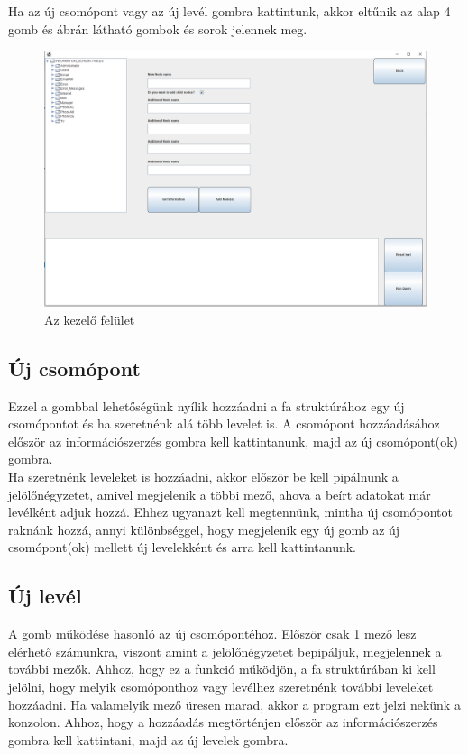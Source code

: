 Ha az új csomópont vagy az új levél gombra kattintunk, akkor eltűnik az alap 4 gomb és  ábrán látható gombok és sorok jelennek meg.

\begin{figure} [H]
	\centering
	\includegraphics[width=.9\textwidth]{images/modify_screen.png}
	\caption{Az kezelő felület}
	\label{fig:modify_screen}
\end{figure}

\subsection{Új csomópont} Ezzel a gombbal lehetőségünk nyílik hozzáadni a fa struktúrához egy új csomópontot és ha szeretnénk alá több levelet is. A csomópont hozzáadásához először az információszerzés gombra kell kattintanunk, majd az új csomópont(ok) gombra.\\
Ha szeretnénk leveleket is hozzáadni, akkor először be kell pipálnunk a jelölőnégyzetet, amivel megjelenik a többi mező, ahova a beírt adatokat már levélként adjuk hozzá. Ehhez ugyanazt kell megtennünk, mintha új csomópontot raknánk hozzá, annyi különbséggel, hogy megjelenik egy új gomb az új csomópont(ok) mellett új levelekként és arra kell kattintanunk. 

\subsection{Új levél} A gomb működése hasonló az új csomópontéhoz. Először csak 1 mező lesz elérhető számunkra, viszont amint a jelölőnégyzetet bepipáljuk, megjelennek a további mezők. Ahhoz, hogy ez a funkció működjön, a fa struktúrában ki kell jelölni, hogy melyik csomóponthoz vagy levélhez szeretnénk további leveleket hozzáadni. Ha valamelyik mező üresen marad, akkor a program ezt jelzi nekünk a konzolon. Ahhoz, hogy a hozzáadás megtörténjen először az információszerzés gombra kell kattintani, majd az új levelek gombra.

